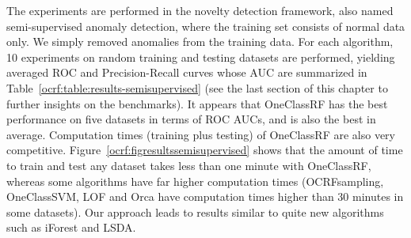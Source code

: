 %
The experiments are performed in the novelty detection framework, also named
semi-supervised anomaly detection, where the training set consists of normal
data only. We simply removed anomalies from the training data.
%
%
For each algorithm, 10 experiments on random training and testing datasets are
performed, yielding averaged ROC and Precision-Recall curves whose AUC are
summarized in Table~\ref{ocrf:table:results-semisupervised}
(see the last section of this chapter to further insights on the benchmarks).
%
It appears that OneClassRF has the best performance on five datasets
in terms of ROC AUCs, and is also the best in average.
Computation times (training plus testing) of OneClassRF are also
very competitive. %
Figure~\ref{ocrf:figresultssemisupervised} shows that the amount of time
to train and test any dataset takes less than one minute with OneClassRF,
whereas some algorithms have far higher computation times (OCRFsampling,
OneClassSVM, LOF and Orca have computation times higher than 30 minutes in some
datasets). Our approach leads to results similar to quite new algorithms such as
iForest and LSDA.
%
%



